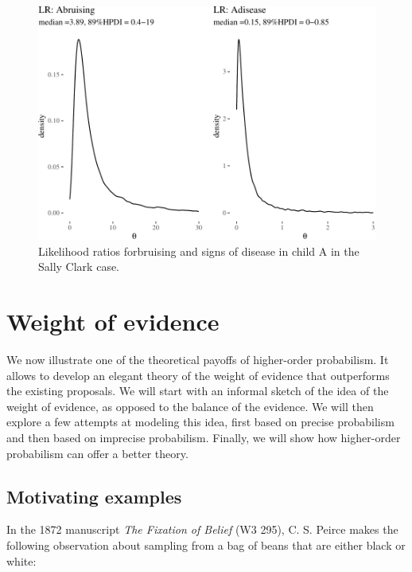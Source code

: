 \documentclass[
  10pt,
  dvipsnames,enabledeprecatedfontcommands]{scrartcl}
\begin{document}
\begin{figure}[H]


\begin{center}\includegraphics[width=0.9\linewidth]{chapter-outline_files/figure-latex/SClrs-1} \end{center}

\caption{Likelihood ratios forbruising and signs of disease in child A in the Sally Clark case.}
\label{fig:SClrs}

\end{figure}

\hypertarget{weight-of-evidence}{%
\section{Weight of evidence}\label{weight-of-evidence}}

We now illustrate one of the theoretical payoffs of higher-order
probabilism. It allows to develop an elegant theory of the weight of
evidence that outperforms the existing proposals. We will start with an
informal sketch of the idea of the weight of evidence, as opposed to the
balance of the evidence. We will then explore a few attempts at modeling
this idea, first based on precise probabilism and then based on
imprecise probabilism. Finally, we will show how higher-order
probabilism can offer a better theory.

\hypertarget{motivating-examples}{%
\subsection{Motivating examples}\label{motivating-examples}}

In the 1872 manuscript \emph{The Fixation of Belief} (W3 295), C. S.
Peirce makes the following observation about sampling from a bag of
beans that are either black or white:
\end{document}
